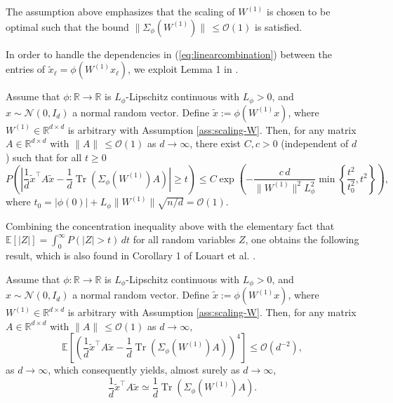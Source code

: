 \documentclass{article}
\begin{document}
\bigskip
\par
The assumption above emphasizes that the scaling of $W^{(1)}$ is chosen to be optimal such that the bound $\|\Sigma_\phi(W^{(1)})\|\,\leq\mathcal{O}(1)$ is satisfied.
\bigskip
\par
In order to handle the dependencies in (\ref{eq:linearcombination}) between the entries of $\tilde{x}_\ell=\phi(W^{(1)}x_\ell)$, we exploit Lemma 1 in \cite{louart}.
\bigskip
\begin{lemma}
Assume that $\phi:\mathbb{R}\to\mathbb{R}$ is $L_\phi$-Lipschitz continuous with $L_\phi>0$, and $x\sim\mathcal{N}(0,I_d)$ a normal random vector. Define $\tilde{x}:=\phi(W^{(1)}x)$, where $W^{(1)}\in\mathbb{R}^{d\times d}$ is arbitrary with Assumption \ref{ass:scaling-W}. Then, for any matrix $A\in\mathbb{R}^{d\times d}$ with $\|A\|\,\leq\mathcal{O}(1)$ as $d\to\infty$, there exist $C,c>0$ (independent of $d$) such that for all $t\geq0$
$$P\left(\left|\frac{1}{d}\tilde{x}^\top A \tilde{x}-\frac{1}{d}\operatorname{Tr}\left(\Sigma_\phi(W^{(1)})A\right)\right|\geq t\right)\leq C\exp\left(-\frac{c\,d}{\|W^{(1)}\|^2L_\phi^2}\min\left\{\frac{t^2}{t_0^2},t^2\right\}\right),$$
where $t_0=|\phi(0)|+L_\phi\|W^{(1)}\|\sqrt{n/d}=\mathcal{O}(1)$.\label{thm:louart}
\end{lemma}
\bigskip
\par
Combining the concentration inequality above with the elementary fact that 
\\$\mathbb{E}[|Z|]=\int_0^\infty P(|Z|>t)\,dt$ for all random variables $Z$, one obtains the following result, which is also found in Corollary 1 of Louart et al. \cite{louart}.
\bigskip
\begin{corollary} Assume that $\phi:\mathbb{R}\to\mathbb{R}$ is $L_\phi$-Lipschitz continuous with $L_\phi>0$, and $x\sim\mathcal{N}(0,I_d)$ a normal random vector. Define $\tilde{x}:=\phi(W^{(1)}x)$, where $W^{(1)}\in\mathbb{R}^{d\times d}$ is arbitrary with Assumption \ref{ass:scaling-W}. Then, for any matrix $A\in\mathbb{R}^{d\times d}$ with $\|A\|\,\leq\mathcal{O}(1)$ as $d\to\infty$,
\begin{equation*}
\mathbb{E}\left[\left(\frac{1}{d}\tilde{x}^\top A \tilde{x}-\frac{1}{d}\operatorname{Tr}\left(\Sigma_\phi(W^{(1)})A\right)\right)^4\right]\leq\mathcal{O}(d^{-2}),
\end{equation*}
as $d\to\infty$, which consequently yields, almost surely as $d\to\infty$,
$$\frac{1}{d}\tilde{x}^\top A\tilde{x}\simeq\frac{1}{d}\operatorname{Tr}\left(\Sigma_\phi(W^{(1)})A\right).$$\label{thm:trace-lemma2}
\end{corollary}
\end{document}
